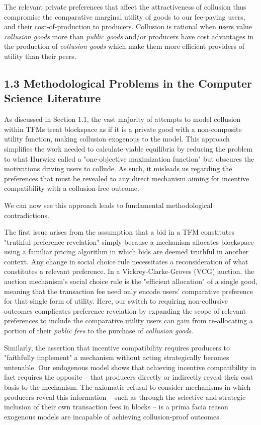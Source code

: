 \documentclass[oneside]{article}   	%
\begin{document}
The relevant private preferences that affect the attractiveness of collusion thus compromise the comparative marginal utility of goods to our fee-paying users, and their cost-of-production to producers. Collusion is rational when users value \textit{collusion goods} more than \textit{public goods} and/or producers have cost advantages in the production of \textit{collusion goods} which make them more efficient providers of utility than their peers.

\subsection*{1.3 Methodological Problems in the Computer Science Literature}

As discussed in Section 1.1, the vast majority of attempts to model collusion within TFMs treat blockspace as if it is a private good with a non-composite utility function, making collusion exogenous to the model. This approach simplifies the work needed to calculate viable equilibria by reducing the problem to what Hurwicz called a "one-objective maximization function" but obscures the motivations driving users to collude. As such, it misleads us regarding the preferences that must be revealed to any direct mechanism aiming for incentive compatibility with a collusion-free outcome. 

We can now see this approach leads to fundamental methodological contradictions.

The first issue arises from the assumption that a bid in a TFM constitutes "truthful preference revelation" simply because a mechanism allocates blockspace using a familiar pricing algorithm in which bids are deemed truthful in another context. Any change in social choice rule necessitates a reconsideration of what constitutes a relevant preference. In a Vickrey-Clarke-Groves (VCG) auction, the auction mechanism's social choice rule is the "efficient allocation" of a single good, meaning that the transaction fee need only encode users' comparative preference for that single form of utility. Here, our switch to requiring non-collusive outcomes complicates preference revelation by expanding the scope of relevant preferences to include the comparative utility users can gain from re-allocating a portion of their \textit{public fees} to the purchase of \textit{collusion goods}.

Similarly, the assertion that incentive compatibility requires producers to "faithfully implement" a mechanism without acting strategically becomes untenable. Our endogenous model shows that achieving incentive compatibility in fact requires the opposite -- that producers directly or indirectly reveal their cost basis to the mechanism. The axiomatic refusal to consider mechanisms in which producers reveal this information -- such as through the selective and strategic inclusion of their own transaction fees in blocks -- is a prima facia reason exogenous models are incapable of achieving collusion-proof outcomes.
\end{document}
